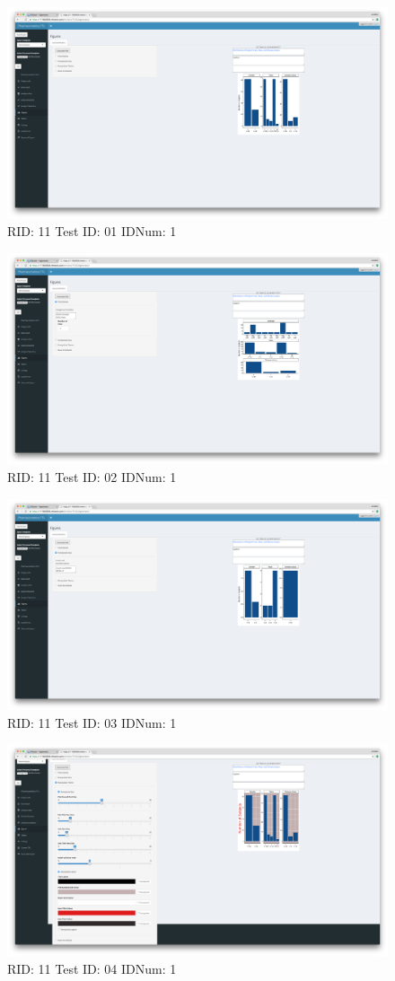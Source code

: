 \begin{figure}[H]
\includegraphics[width=.8\textwidth]{screencaps/11-01-1.png}
\caption{RID: 11 Test ID: 01 IDNum: 1}
\end{figure}
\begin{figure}[H]
\includegraphics[width=.8\textwidth]{screencaps/11-02-1.png}
\caption{RID: 11 Test ID: 02 IDNum: 1}
\end{figure}
\begin{figure}[H]
\includegraphics[width=.8\textwidth]{screencaps/11-03-1.png}
\caption{RID: 11 Test ID: 03 IDNum: 1}
\end{figure}
\begin{figure}[H]
\includegraphics[width=.8\textwidth]{screencaps/11-04-1.png}
\caption{RID: 11 Test ID: 04 IDNum: 1}
\end{figure}
